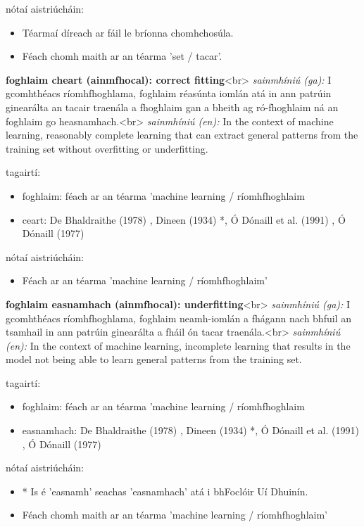 \documentclass{article}
\begin{document}
nótaí aistriúcháin:
\begin{itemize}
	\item Téarmaí díreach ar fáil le bríonna chomhchosúla.
	\item Féach chomh maith ar an téarma 'set / tacar'.
\end{itemize}


\textbf{foghlaim cheart (ainmfhocal): correct fitting}<br>
\textit{sainmhíniú (ga):} I gcomhthéacs ríomhfhoghlama, foghlaim réasúnta iomlán atá in ann patrúin ginearálta an tacair traenála a fhoghlaim gan a bheith ag ró-fhoghlaim ná an foghlaim go heasnamhach.<br>
\textit{sainmhíniú (en):} In the context of machine learning, reasonably complete learning that can extract general patterns from the training set without overfitting or underfitting.

tagairtí:
\begin{itemize}
	\item foghlaim: féach ar an téarma 'machine learning / ríomhfhoghlaim
	\item ceart: De Bhaldraithe (1978) \cite{de-bhaldraithe}, Dineen (1934) \cite{dineen}*, Ó Dónaill et al. (1991) \cite{focloir-beag}, Ó Dónaill (1977) \cite{odonaill}
\end{itemize}

nótaí aistriúcháin:
\begin{itemize}
	\item Féach ar an téarma 'machine learning / ríomhfhoghlaim'
\end{itemize}


\textbf{foghlaim easnamhach (ainmfhocal): underfitting}<br>
\textit{sainmhíniú (ga):} I gcomhthéacs ríomhfhoghlama, foghlaim neamh-iomlán a fhágann nach bhfuil an tsamhail in ann patrúin ginearálta a fháil ón tacar traenála.<br>
\textit{sainmhíniú (en):} In the context of machine learning, incomplete learning that results in the model not being able to learn general patterns from the training set.

tagairtí:
\begin{itemize}
	\item foghlaim: féach ar an téarma 'machine learning / ríomhfhoghlaim
	\item easnamhach: De Bhaldraithe (1978) \cite{de-bhaldraithe}, Dineen (1934) \cite{dineen}*, Ó Dónaill et al. (1991) \cite{focloir-beag}, Ó Dónaill (1977) \cite{odonaill}
\end{itemize}

nótaí aistriúcháin:
\begin{itemize}
	\item * Is é 'easnamh' seachas 'easnamhach' atá i bhFoclóir Uí Dhuinín.
	\item Féach chomh maith ar an téarma 'machine learning / ríomhfhoghlaim'
\end{itemize}
\end{document}
